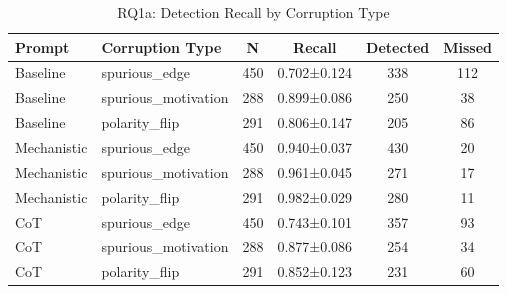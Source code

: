 \begin{table}[htbp]
\centreing
\caption{RQ1a: Detection Recall by Corruption Type}
\label{tab:rq1a_corruption_type}
\begin{tabular}{llcccc}
\toprule
\textbf{Prompt} & \textbf{Corruption Type} & \textbf{N} & \textbf{Recall} & \textbf{Detected} & \textbf{Missed} \\
\midrule
Baseline & spurious_edge & 450 & 0.702±0.124 & 338 & 112 \\
Baseline & spurious_motivation & 288 & 0.899±0.086 & 250 & 38 \\
Baseline & polarity_flip & 291 & 0.806±0.147 & 205 & 86 \\
Mechanistic & spurious_edge & 450 & 0.940±0.037 & 430 & 20 \\
Mechanistic & spurious_motivation & 288 & 0.961±0.045 & 271 & 17 \\
Mechanistic & polarity_flip & 291 & 0.982±0.029 & 280 & 11 \\
CoT & spurious_edge & 450 & 0.743±0.101 & 357 & 93 \\
CoT & spurious_motivation & 288 & 0.877±0.086 & 254 & 34 \\
CoT & polarity_flip & 291 & 0.852±0.123 & 231 & 60 \\
\bottomrule
\end{tabular}
\end{table}